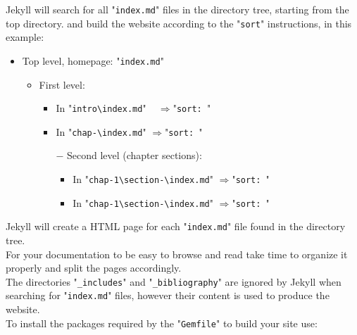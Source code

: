 \clearpage
\noindent Jekyll will search for all "\texttt{index.md}" files in the directory tree, starting from the top directory. 
and build the website according to the "\texttt{sort}" instructions, in this example:
\begin{itemize}
\item Top level, homepage: "\texttt{index.md}"
\begin{itemize}
\item First level: \\
\begin{itemize}
\item In "\texttt{intro\textbackslash index.md}"  \,\,\ \quad$\Longrightarrow$\quad "\texttt{sort: }"\\
\item In "\texttt{chap-\textbackslash index.md}" \quad$\Longrightarrow$\quad "\texttt{sort: }"\\
\item[$-$] Second level (chapter sections): \\
\begin{itemize}
\item In "\texttt{chap-1\textbackslash section-\textbackslash index.md}" \quad$\Longrightarrow$\quad "\texttt{sort: }"\\
\item In "\texttt{chap-1\textbackslash section-\textbackslash index.md}" \quad$\Longrightarrow$\quad "\texttt{sort: }"\\
\end{itemize}
\end{itemize}
\end{itemize}
\end{itemize}
Jekyll will create a HTML page for each "\texttt{index.md}" file found in the directory tree. \\
For your documentation to be easy to browse and read take time to organize it properly and split the pages accordingly. \\
The directories "\texttt{\_includes}" and "\texttt{\_bibliography}" are ignored by Jekyll when searching for "\texttt{index.md}" files, 
however their content is used to produce the website. \\[0.25cm]
To install the packages required by the "\texttt{Gemfile}" to build your site use:
\begin{script}
  
\end{script}\\[-0.75cm]
